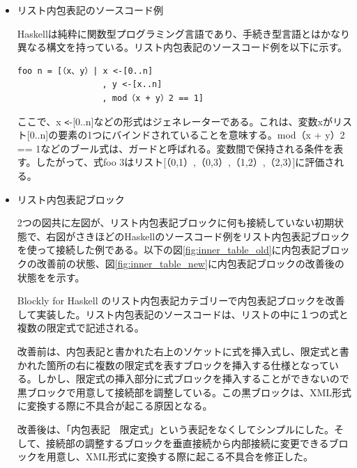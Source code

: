 \documentclass{risepaper}
\begin{document}
\begin{itemize}

\item リスト内包表記のソースコード例

Haskellは純粋に関数型プログラミング言語であり、手続き型言語とはかなり異なる構文を持っている。リスト内包表記のソースコード例を以下に示す。

\begin{lstlisting}[basicstyle=\ttfamily\footnotesize]
foo n = [（x、y）| x <-[0..n]
                 , y <-[x..n]
                 , mod（x + y）2 == 1]
\end{lstlisting}

ここで、x \verb|<|-[0..n]などの形式はジェネレーターである。これは、変数xがリスト[0..n]の要素の1つにバインドされていることを意味する。mod（x + y）2 == 1などのブール式は、ガードと呼ばれる。変数間で保持される条件を表す。したがって、式foo 3はリスト[（0,1）,（0,3）,（1,2）,（2,3）]に評価される。

\item リスト内包表記ブロック

2つの図共に左図が、リスト内包表記ブロックに何も接続していない初期状態で、右図がさきほどのHaskellのソースコード例をリスト内包表記ブロックを使って接続した例である。以下の図\ref{fig:inner_table_old}に内包表記ブロックの改善前の状態、図\ref{fig:inner_table_new}に内包表記ブロックの改善後の状態をを示す。

Blockly for Haskell のリスト内包表記カテゴリーで内包表記ブロックを改善して実装した。リスト内包表記のソースコードは、リストの中に１つの式と複数の限定式で記述される。

改善前は、内包表記と書かれた右上のソケットに式を挿入式し、限定式と書かれた箇所の右に複数の限定式を表すブロックを挿入する仕様となっている。しかし、限定式の挿入部分に式ブロックを挿入することができないので黒ブロックで用意して接続部を調整している。この黒ブロックは、XML形式に変換する際に不具合が起こる原因となる。

改善後は、「内包表記　限定式」という表記をなくしてシンプルにした。そして、接続部の調整するブロックを垂直接続から内部接続に変更できるブロックを用意し、XML形式に変換する際に起こる不具合を修正した。



\end{itemize}
\end{document}
